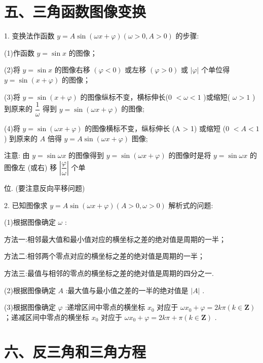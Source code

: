 \section*{五、三角函数图像变换}

1. 变换法作函数 $y = A\sin \left( {{\omega x} + \varphi }\right) \left( {\omega  > 0,A > 0}\right)$ 的步骤:

(1)作函数 $y = \sin x$ 的图像；

(2)将 $y = \sin x$ 的图像右移 $\left( {\varphi  < 0}\right)$ 或左移 $\left( {\varphi  > 0}\right)$ 或 $\left| \varphi \right|$ 个单位得 $y = \sin \left( {x + \varphi }\right)$ 的图像；

(3)将 $y = \sin \left( {x + \varphi }\right)$ 的图像纵标不变，横标伸长(0 $< \omega  < 1$ )或缩短( $\omega  > 1$ )到原来的 $\dfrac{1}{\omega }$ 得到 $y = \sin \left( {{\omega x} + \varphi }\right)$ 的图像;

(4)将 $y = \sin \left( {{\omega x} + \varphi }\right)$ 的图像横标不变，纵标伸长 (A > 1) 或缩短 (0 $< A < 1$ ) 到原来的 $A$ 倍得 $y =  A\sin \left( {{\omega x} + \varphi }\right)$ 图像;

注意: 由 $y = \sin {\omega x}$ 的图像得到 $y = \sin \left( {{\omega x} + \varphi }\right)$ 的图像时是将 $y = \sin {\omega x}$ 的图像左 (或右) 移 $\left| \dfrac{\varphi }{\omega }\right|$ 个单

位. (要注意反向平移问题)

2. 已知图像求 $y = A\sin \left( {{\omega x} + \varphi }\right) \left( {A > 0,\omega  > 0}\right)$ 解析式的问题:

(1)根据图像确定 $\omega$ :

方法一:相邻最大值和最小值对应的横坐标之差的绝对值是周期的一半；

方法二:相邻两个零点对应的横坐标之差的绝对值是周期的一半；

方法三:最值与相邻的零点的横坐标之差的绝对值是周期的四分之一.

(2)根据图像确定 $A$ :最大值与最小值之差的一半的绝对值是 $\left| A\right|$ .

(3)根据图像确定 $\varphi$ :递增区间中零点的横坐标 ${x}_{0}$ 对应于 $\omega {x}_{0} + \varphi  = {2k\pi }\left( {k \in  \mathbf{Z}}\right)$ ；递减区间中零点的横坐标 ${x}_{0}$ 对应于 $\omega {x}_{0} + \varphi  = {2k\pi } + \pi \left( {k \in  \mathbf{Z}}\right)$ .

\section*{六、反三角和三角方程}

